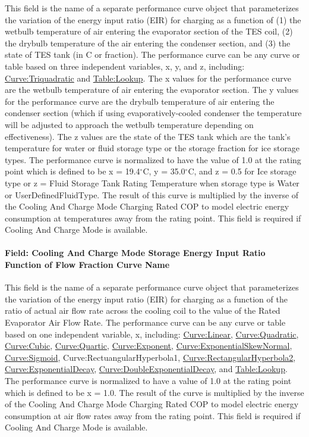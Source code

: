 This field is the name of a separate performance curve object that parameterizes the variation of the energy input ratio (EIR) for charging as a function of (1) the wetbulb temperature of air entering the evaporator section of the TES coil, (2) the drybulb temperature of the air entering the condenser section, and (3) the state of TES tank (in C or fraction). The performance curve can be any curve or table based on three independent variables, x, y, and z, including: \hyperref[curvetriquadratic]{Curve:Triquadratic} and \hyperref[tablelookup]{Table:Lookup}. The x values for the performance curve are the wetbulb temperature of air entering the evaporator section. The y values for the performance curve are the drybulb temperature of air entering the condenser section (which if using evaporatively-cooled condenser the temperature will be adjusted to approach the wetbulb temperature depending on effectiveness). The z values are the state of the TES tank which are the tank's temperature for water or fluid storage type or the storage fraction for ice storage types. The performance curve is normalized to have the value of 1.0 at the rating point which is defined to be x = 19.4$^\circ$C, y = 35.0$^\circ$C, and z = 0.5 for Ice storage type or z = Fluid Storage Tank Rating Temperature when storage type is Water or UserDefinedFluidType. The result of this curve is multiplied by the inverse of the Cooling And Charge Mode Charging Rated COP to model electric energy consumption at temperatures away from the rating point. This field is required if Cooling And Charge Mode is available.

\paragraph{Field: Cooling And Charge Mode Storage Energy Input Ratio Function of Flow Fraction Curve Name}\label{field-cooling-and-charge-mode-storage-energy-input-ratio-function-of-flow-fraction-curve-name}

This field is the name of a separate performance curve object that parameterizes the variation of the energy input ratio (EIR) for charging as a function of the ratio of actual air flow rate across the cooling coil to the value of the Rated Evaporator Air Flow Rate. The performance curve can be any curve or table based on one independent variable, x, including: \hyperref[curvelinear]{Curve:Linear}, \hyperref[curvequadratic]{Curve:Quadratic}, \hyperref[curvecubic]{Curve:Cubic}, \hyperref[curvequartic]{Curve:Quartic}, \hyperref[curveexponent]{Curve:Exponent}, \hyperref[curveexponentialskewnormal]{Curve:ExponentialSkewNormal}, \hyperref[curvesigmoid]{Curve:Sigmoid}, Curve:RectuangularHyperbola1, \hyperref[curverectangularhyperbola2]{Curve:RectangularHyperbola2}, \hyperref[curveexponentialdecay]{Curve:ExponentialDecay}, \hyperref[curvedoubleexponentialdecay]{Curve:DoubleExponentialDecay}, and \hyperref[tablelookup]{Table:Lookup}. The performance curve is normalized to have a value of 1.0 at the rating point which is defined to be x = 1.0. The result of the curve is multiplied by the inverse of the Cooling And Charge Mode Charging Rated COP to model electric energy consumption at air flow rates away from the rating point. This field is required if Cooling And Charge Mode is available.

